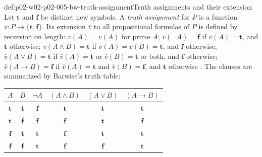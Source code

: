 \begin{hbdefinition}{def:p02-w02-p02-005-bw-truth-assignment}{Truth assignments and their extension}
Let \(\mathbf t\) and \(\mathbf f\) be distinct new symbols.  A
\emph{truth assignment} for \(P\) is a function
\(v:P\to\{\mathbf t,\mathbf f\}\).  Its extension \(\bar v\) to all
propositional formulas of \(P\) is defined by recursion on length:
\(\bar v(A)=v(A)\) for prime \(A\); \(\bar v(\neg A)=\mathbf f\) if
\(\bar v(A)=\mathbf t\), and \(\mathbf t\) otherwise;
\(\bar v(A\land B)=\mathbf t\) if \(\bar v(A)=\bar v(B)=\mathbf t\), and
\(\mathbf f\) otherwise; \(\bar v(A\lor B)=\mathbf t\) if
\(\bar v(A)=\mathbf t\) or \(\bar v(B)=\mathbf t\) or both, and \(\mathbf f\)
otherwise; \(\bar v(A\to B)=\mathbf f\) if \(\bar v(A)=\mathbf t\) and
\(\bar v(B)=\mathbf f\), and \(\mathbf t\) otherwise
\cite[ch.~A.1, \S4, p.~24]{Barwise1977FirstOrder}.  The clauses are
summarized by Barwise's truth table:
\begin{center}
\begin{tabular}{cc|cccc}
\(A\) & \(B\) & \(\neg A\) & \((A\land B)\) & \((A\lor B)\) & \((A\to B)\)\\
\hline
\(\mathbf t\) & \(\mathbf t\) & \(\mathbf f\) & \(\mathbf t\) & \(\mathbf t\) & \(\mathbf t\)\\
\(\mathbf t\) & \(\mathbf f\) & \(\mathbf f\) & \(\mathbf f\) & \(\mathbf t\) & \(\mathbf f\)\\
\(\mathbf f\) & \(\mathbf t\) & \(\mathbf t\) & \(\mathbf f\) & \(\mathbf t\) & \(\mathbf t\)\\
\(\mathbf f\) & \(\mathbf f\) & \(\mathbf t\) & \(\mathbf f\) & \(\mathbf f\) & \(\mathbf t\)
\end{tabular}
\end{center}
\end{hbdefinition}

